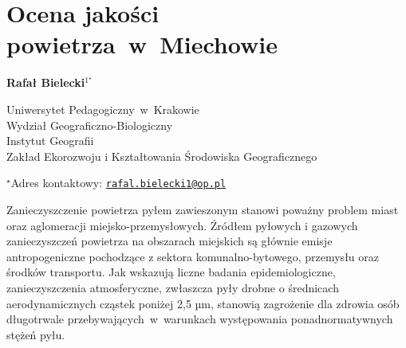 \documentclass[\main/boa.tex]{subfiles}
\begin{document}
\section{Ocena jakości powietrza~w~Miechowie}

\begin{center}
  {\bf {} Rafał Bielecki$^{1^\star}$}
\end{center}

\vskip 0.3cm

\begin{affiliations}
\begin{enumerate}
\begin{minipage}{0.915\textwidth}
\centering
\item Uniwersytet Pedagogiczny~w~Krakowie \\ Wydział Geograficzno-Biologiczny  \\ Instytut Geografii \\
Zakład Ekorozwoju i Kształtowania Środowiska Geograficznego \\[-2pt]
\end{minipage}
\end{enumerate}
$^\star$Adres kontaktowy: \href{mailto:rafal.bielecki1@op.pl}{\nolinkurl{rafal.bielecki1@op.pl}}\\
\end{affiliations}

\vskip 0.5cm


\vskip 0.5cm

Zanieczyszczenie powietrza pyłem zawieszonym stanowi poważny problem miast oraz aglomeracji miejsko-przemysłowych. Źródłem pyłowych i gazowych zanieczyszczeń powietrza na obszarach miejskich są głównie emisje antropogeniczne pochodzące z sektora komunalno-bytowego, przemysłu oraz środków transportu. Jak wskazują liczne badania epidemiologiczne, zanieczyszczenia atmosferyczne, zwłaszcza pyły drobne o średnicach aerodynamicznych cząstek poniżej 2,5 µm, stanowią zagrożenie dla zdrowia osób długotrwale przebywających~w~warunkach występowania ponadnormatywnych stężeń pyłu.
\end{document}
